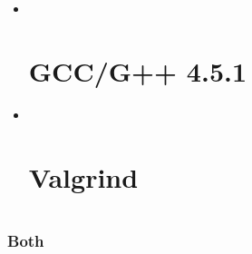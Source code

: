 \documentclass[a4paper,11pt,twoside,pdftex,draft]{article}
\begin{document}
\begin{itemize}
\item ~
  \hypertarget{gccg-4.5.1}{%
  \section[GCC/G++
  4.5.1]{\texorpdfstring{\protect\hypertarget{anchor-11}{}{}GCC/G++
  4.5.1}{GCC/G++ 4.5.1}}\label{gccg-4.5.1}}
\item ~
  \hypertarget{valgrind}{%
  \section{Valgrind}\label{valgrind}}

  \hypertarget{section-4}{%
  \section{}\label{section-4}}
\end{itemize}

\hypertarget{both}{%
\subsubsection[Both]{\texorpdfstring{\protect\hypertarget{anchor-12}{}{}Both}{Both}}\label{both}}
\end{document}
